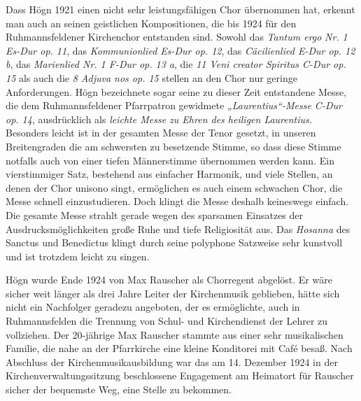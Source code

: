 \documentclass{book}
\begin{document}
Dass Högn 1921 einen nicht sehr leistungsfähigen Chor übernommen hat,
erkennt man auch an seinen geistlichen Kompositionen, die bis 1924 für
den Ruhmannsfeldener Kirchenchor entstanden sind. Sowohl das
\textit{Tantum ergo} \textit{Nr.} \textit{1 Es-Dur op. 11}, das
\textit{Kommunionlied Es-Dur op. 12}, das \textit{Cäcilienlied E-Dur
op. 12 b}, das \textit{Marienlied Nr. 1 F-Dur op. 13 a}, die \textit{11
Veni creator Spiritus C-Dur op. 15} als auch die \textit{8 Adjuva nos
op. 15} stellen an den Chor nur geringe Anforderungen. Högn bezeichnete
sogar seine zu dieser Zeit entstandene Messe, die dem
Ruhmannsfeldener Pfarrpatron gewidmete \textit{„Laurentius“-Messe
C-Dur op. 14}, ausdrücklich als \textit{leichte Messe zu Ehren des
heiligen Laurentius.} Besonders leicht ist in der gesamten Messe der
Tenor gesetzt, in unseren Breitengraden die am schwersten zu besetzende
Stimme, so dass diese Stimme notfalls auch von einer tiefen
Männerstimme übernommen werden kann. Ein vierstimmiger Satz, bestehend
aus einfacher Harmonik, und viele Stellen, an denen der Chor unisono
singt, ermöglichen es auch einem schwachen Chor, die Messe schnell
einzustudieren. Doch klingt die Messe deshalb keineswegs einfach. Die
gesamte Messe strahlt gerade wegen des sparsamen Einsatzes der
Ausdrucksmöglichkeiten große Ruhe und tiefe Religiosität aus. Das
\textit{Hosanna} des Sanctus und Benedictus klingt durch seine
polyphone Satzweise sehr kunstvoll und ist trotzdem leicht zu singen.

Högn wurde Ende 1924 von Max Rauscher als Chorregent abgelöst. Er wäre
sicher weit länger als drei Jahre Leiter der Kirchenmusik geblieben,
hätte sich nicht ein Nachfolger geradezu angeboten, der es ermöglichte,
auch in Ruhmannsfelden die Trennung von Schul- und Kirchendienst der
Lehrer zu vollziehen. Der 20-jährige Max Rauscher stammte aus einer
sehr musikalischen Familie, die nahe an der Pfarrkirche eine kleine
Konditorei mit Café besaß. Nach Abschluss der Kirchenmusikausbildung
war das am 14. Dezember 1924 in der Kirchenverwaltungssitzung
beschlossene Engagement am Heimatort für Rauscher sicher der bequemste
Weg, eine Stelle zu bekommen.

\end{document}
